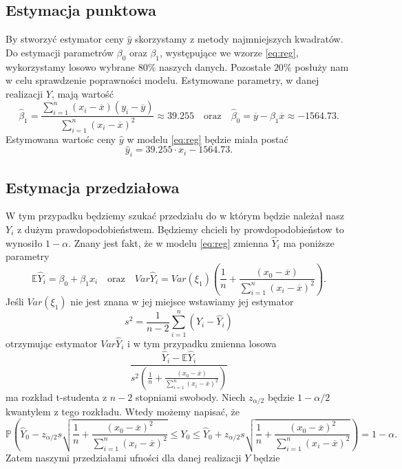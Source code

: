 \documentclass[12pt,leqno]{article}
\theoremstyle{exer}
\begin{document}
	\subsection{Estymacja punktowa}
	By stworzyć estymator ceny $\hat y$ skorzystamy z metody najmniejszych kwadratów. Do estymacji parametrów $\beta_0$ oraz $\beta_1$, występujące we wzorze \eqref{eq:reg}, wykorzystamy losowo wybrane $80\%$ naszych danych. Pozostałe $20\%$ posłuży nam w celu sprawdzenie poprawności modelu. Estymowane parametry, w danej realizacji $Y$, mają wartość
	\begin{equation}
		\hat\beta_1=\frac{\sum_{i=1}^n\left(x_i-\overline{x}\right)\left(y_i-\overline{y}\right)}
		{\sum_{i=1}^n\left(x_i-\overline{x}\right)^2}\approx39.255 \quad \text{oraz} \quad
		\hat\beta_0=\overline{y}-\beta_1\overline{x}\approx-1564.73.
	\end{equation}
	Estymowana wartośc ceny $\hat y$ w modelu \eqref{eq:reg} będzie miała postać
	\begin{equation}
		\hat y_i = 39.255\cdot x_i -1564.73.
	\end{equation}
	\subsection{Estymacja przedziałowa}
	W tym przypadku będziemy szukać przedziału do w którym będzie należał nasz $Y_i$ z dużym prawdopodobieństwem. Będziemy chcieli by prowdopodobieństow to wynosiło $1-\alpha$. Znany jest fakt, że w modelu \eqref{eq:reg} zmienna $\hat{Y}_i$ ma poniższe parametry
	\begin{equation}
		\mathbb{E}\hat Y_i = \beta_0+\beta_1x_i \quad\text{oraz}\quad Var \hat Y_i=Var\left(\xi_1\right)\left(\frac{1}{n}+\frac{(x_0-\overline{x})}{\sum_{i=1}^{n}\left(x_i-\overline{x}\right)^2}\right).
	\end{equation} 
	Jeśli $Var\left(\xi_1\right)$ nie jest znana w jej miejsce wstawiamy jej estymator
	\begin{equation}
		s^2=\frac{1}{n-2}\sum_{i=1}^{n}\left(Y_i-\hat Y_i\right)
	\end{equation}
	otrzymując estymator $Var \hat Y_i$ i w tym przypadku zmienna losowa
	\begin{equation}
		\frac{\hat Y_i-\mathbb{E}\hat Y_i}{s^2\left(\frac{1}{n}+\frac{(x_0-\overline{x})}{\sum_{i=1}^{n}\left(x_i-\overline{x}\right)^2}\right)}
	\end{equation}
	ma rozkład t-studenta z $n-2$ stopniami swobody. Niech $z_{\alpha/2}$ będzie $1-\alpha/2$ kwantylem z tego rozkładu. Wtedy możemy napisać, że 
	\begin{equation}
		\mathbb{P}\left(\hat Y_0 - z_{\alpha/2}s\sqrt{\frac{1}{n}+\frac{\left(x_0-\overline{x}\right)^2}{\sum_{i=1}^n\left(x_i-\overline{x}\right)^2}}\leq Y_0\leq\hat Y_0 + z_{\alpha/2}s\sqrt{\frac{1}{n}+\frac{\left(x_0-\overline{x}\right)^2}{\sum_{i=1}^n\left(x_i-\overline{x}\right)^2}}\right)=1-\alpha.
	\end{equation}
	Zatem naszymi przedziałami ufności dla danej realizacji $Y$ będzie 
	
	\subsection{}
\end{document}
